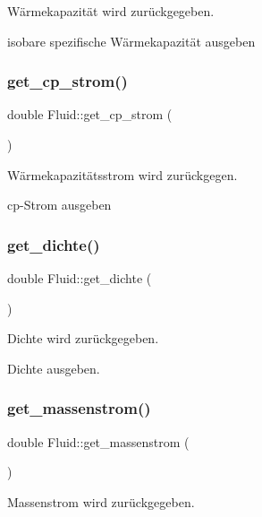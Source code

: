 Wärmekapazität wird zurückgegeben. 

isobare spezifische Wärmekapazität ausgeben \mbox{\label{class_fluid_a5c589565d1bde26bc83125e3e8939796}} 
\subsubsection{\texorpdfstring{get\+\_\+cp\+\_\+strom()}{get\_cp\_strom()}}
{\footnotesize\ttfamily double Fluid\+::get\+\_\+cp\+\_\+strom (\begin{DoxyParamCaption}{ }\end{DoxyParamCaption})}



Wärmekapazitätsstrom wird zurückgegen. 

cp-\/\+Strom ausgeben \mbox{\label{class_fluid_acb9e3346c0871ad5fefc9d11dcfc3283}} 
\subsubsection{\texorpdfstring{get\+\_\+dichte()}{get\_dichte()}}
{\footnotesize\ttfamily double Fluid\+::get\+\_\+dichte (\begin{DoxyParamCaption}{ }\end{DoxyParamCaption})}



Dichte wird zurückgegeben. 

Dichte ausgeben. \mbox{\label{class_fluid_afd9451c48ea66d15fdb8226da58da28e}} 
\subsubsection{\texorpdfstring{get\+\_\+massenstrom()}{get\_massenstrom()}}
{\footnotesize\ttfamily double Fluid\+::get\+\_\+massenstrom (\begin{DoxyParamCaption}{ }\end{DoxyParamCaption})}



Massenstrom wird zurückgegeben. 

